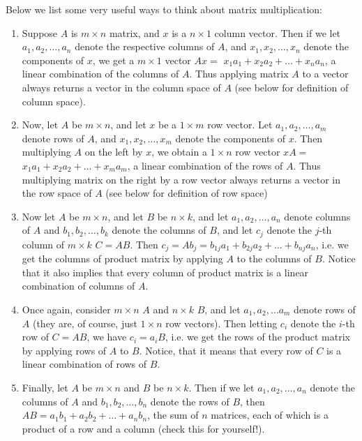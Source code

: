 \documentclass[12pt,oneside]{article}
\begin{document}
Below we list some very useful ways to think about matrix multiplication:
\begin{enumerate}
\item Suppose $A$ is $m \times n$ matrix, and $x$ is a $n \times 1$
  column vector. Then if we let $a_1, a_2, \ldots, a_n$ denote the respective
  columns of $A$, and $x_1, x_2, \ldots, x_n$ denote the components  of
  $x$,  we get a $m \times 1$ vector $Ax = $ $x_1 a_1 + x_2
  a_2 + \ldots + x_n a_n$, a linear combination of the columns of
  $A$. Thus applying matrix $A$ to a vector always returns a vector
  in the column space of $A$ (see below for definition of column
  space).
\item Now, let $A$ be $m \times n$, and let $x$ be a $1 \times m$ row
  vector. Let $a_1, a_2, \ldots, a_m$ denote rows of $A$, and $x_1,
  x_2, \ldots, x_m$ denote the components of $x$. Then multiplying $A$
  on the left by $x$, we obtain a $1 \times n$ row vector $x A =$ $x_1
  a_1 + x_2 a_2 + \ldots + x_m a_m$, a linear combination of the rows
  of $A$. Thus multiplying matrix on the right by a row vector always
  returns a vector in the row space of $A$ (see below for definition
  of row space)
\item Now let $A$ be $m \times n$, and let $B$ be $n \times k$, and
  let $a_1, a_2, \ldots, a_n$ denote columns of $A$ and  $b_1, b_2,
  \ldots, b_k$ denote the columns of $B$, and let $c_j$ denote the
  $j$-th column of $m \times k$ $C = AB$. Then $c_j = A b_j = b_{1j}
  a_1 + b_{2j} a_2 + \ldots +  b_{nj} a_n$, i.e. we get the columns of
  product matrix by applying $A$ to the columns of $B$. Notice that it
  also implies that every column of product matrix is a linear
  combination of columns of $A$.
\item Once again, consider $m \times n$ $A$ and $n \times k$ $B$, and
  let $a_1, a_2, \ldots a_m$ denote rows of $A$ (they are, of course,
  just $1 \times n$ row vectors). Then letting $c_i$ denote the $i$-th
  row of $C = AB$, we have $c_i = a_i B$, i.e. we get the rows of the
  product matrix by applying rows of $A$ to $B$. Notice, that it means
  that every row of $C$ is a linear combination of rows of $B$.
\item Finally, let $A$ be $m \times n$ and $B$ be $n \times k$. Then
  if we let $a_1, a_2, \ldots, a_n$ denote the columns of $A$ and
  $b_1, b_2, \ldots, b_n$ denote the rows of $B$, then $AB = a_1 b_1 +
  a_2 b_2 + \ldots + a_n b_n$, the sum of $n$ matrices, each of which
  is a product of a row and a column (check this for yourself!).
\end{enumerate}
\end{document}
